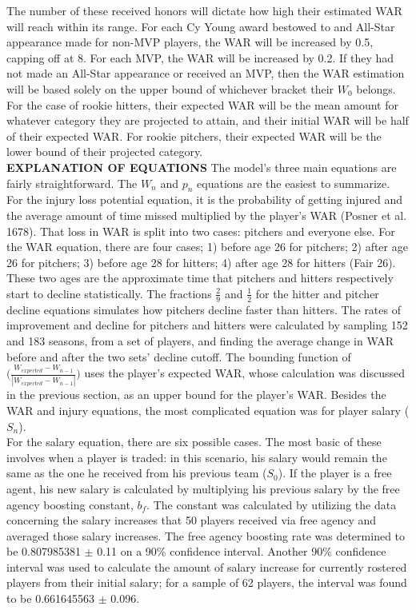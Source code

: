 \documentclass[12pt]{article}
\begin{document}
The number of these received honors will dictate how high their estimated WAR will reach within its range. For each Cy Young award bestowed to and All-Star appearance made for non-MVP players, the WAR will be increased by 0.5, capping off at 8.  For each MVP, the WAR will be increased by 0.2.   If they had not made an All-Star appearance or received an MVP, then the WAR estimation will be based solely on the upper bound of whichever bracket their $W_0$ belongs.  For the case of rookie hitters, their expected WAR will be the mean amount for whatever category they are projected to attain, and their initial WAR will be half of their expected WAR.  For rookie pitchers, their expected WAR will be the lower bound of their projected category. \\ 
\vskip 2pt
\textbf{EXPLANATION OF EQUATIONS}
\vskip 2pt
The model's three main equations are fairly straightforward.  The $W_n$ and $p_n$ equations are the easiest to summarize.  For the injury loss potential equation, it is the probability of getting injured and the average amount of time missed multiplied by the player's WAR (Posner et al. 1678).  That loss in WAR is split into two cases: pitchers and everyone else.  For the WAR equation, there are four cases; 1) before age 26 for pitchers; 2) after age 26 for pitchers; 3) before age 28 for hitters; 4) after age 28 for hitters (Fair 26).  These two ages are the approximate time that pitchers and hitters respectively start to decline statistically.  The fractions $\frac{2}{9}$ and $\frac{1}{2}$ for the hitter and pitcher decline equations simulates how pitchers decline faster than hitters.  The rates of improvement and decline for pitchers and hitters were calculated by sampling 152 and 183 seasons, from a set of players, and finding the average change in WAR before and after the two sets' decline cutoff.  The bounding function of  $\Big(\frac{W_{expected} - W_{n-1}}{|W_{expected} - W_{n-1}|}\Big)$ uses the player's expected WAR, whose calculation was discussed in the previous section, as an upper bound for the player's WAR.  Besides the WAR and injury equations, the most complicated equation was for player salary ($S_n$). \\

For the salary equation, there are six possible cases.  The most basic of these involves when a player is traded: in this scenario, his salary would remain the same as the one he received from his previous team ($S_0$).  If the player is a free agent, his new salary is calculated by multiplying his previous salary by the free agency boosting constant, $b_f$.  The constant was calculated by utilizing the data concerning the salary increases that 50 players received via free agency and averaged those salary increases.  The free agency boosting rate was determined to be 0.807985381 $\pm$ 0.11 on a 90\% confidence interval.  Another 90\% confidence interval was used to calculate the amount of salary increase for currently rostered players from their initial salary; for a sample of 62 players, the interval was found to be  0.661645563 $\pm$ 0.096. \\
\end{document}
